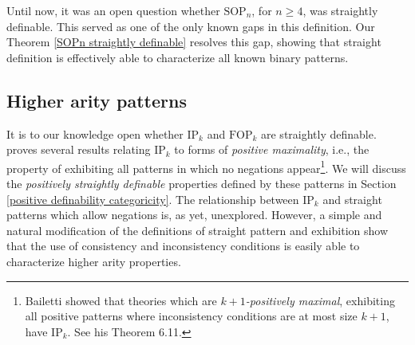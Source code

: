 \documentclass[10pt,a4paper]{amsart}
\newcommand{\SOPn}{$\text{SOP}_n$}
\begin{document}
Until now, it was an open question whether \SOPn, for $n\geq 4$, was straightly definable. This served as one of the only known gaps in this definition. Our Theorem \ref{SOPn straightly definable} resolves this gap, showing that straight definition is effectively able to characterize all known binary patterns. 


\subsection{Higher arity patterns}\label{higher arity straight defn section}

It is to our knowledge open whether $\text{IP}_k$ and $\text{FOP}_k$ are straightly definable. \cite{bailetti2024walk} proves several results relating $\text{IP}_k$ to forms of \textit{positive maximality}, i.e., the property of exhibiting all patterns in which no negations appear\footnote{Bailetti showed that theories which are $k+1$\textit{-positively maximal}, exhibiting all positive patterns where inconsistency conditions are at most size $k+1$, have $\text{IP}_k$. See his Theorem 6.11.}. We will discuss the  \textit{positively straightly definable} properties defined by these patterns in Section \ref{positive definability categoricity}. The relationship between $\text{IP}_k$ and straight patterns which allow negations is, as yet, unexplored. However, a simple and natural modification of the definitions of straight pattern and exhibition show that the use of consistency and inconsistency conditions is easily able to characterize higher arity properties.


\end{document}
